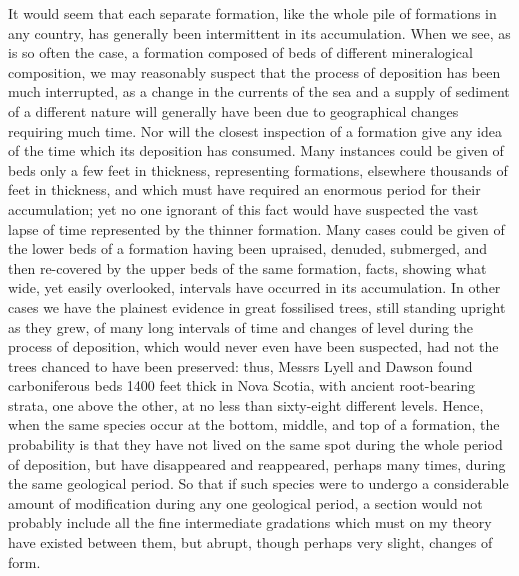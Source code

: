 \indent It would seem that each separate formation, like the whole pile of formations in any country, has generally been intermittent in its accumulation. When we see, as is so often the case, a formation composed of beds of different mineralogical composition, we may reasonably suspect that the process of deposition has been much interrupted, as a change in the currents of the sea and a supply of sediment of a different nature will generally have been due to geographical changes requiring much time. Nor will the closest inspection of a formation give any idea of the time which its deposition has consumed. Many instances could be given of beds only a few feet in thickness, representing formations, elsewhere thousands of feet in thickness, and which must have required an enormous period for their accumulation; yet no one ignorant of this fact would have suspected the vast lapse of time represented by the thinner formation. Many cases could be given of the lower beds of a formation having been upraised, denuded, submerged, and then re-covered by the upper beds of the same formation, facts, showing what wide, yet easily overlooked, intervals have occurred in its accumulation. In other cases we have the plainest evidence in great fossilised trees, still standing upright as they grew, of many long intervals of time and changes of level during the process of deposition, which would never even have been suspected, had not the trees chanced to have been preserved: thus, Messrs Lyell and Dawson found carboniferous beds 1400 feet thick in Nova Scotia, with ancient root-bearing strata, one above the other, at no less than sixty-eight different levels. Hence, when the same species occur at the bottom, middle, and top of a formation, the probability is that they have not lived on the same spot during the whole period of deposition, but have disappeared and reappeared, perhaps many times, during the same geological period. So that if such species were to undergo a considerable amount of modification during any one geological period, a section would not probably include all the fine intermediate gradations which must on my theory have existed between them, but abrupt, though perhaps very slight, changes of form.\\
